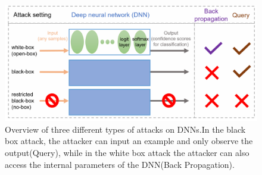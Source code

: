 \documentclass[12pt, conference, letterpaper]{IEEEtran}
\begin{document}
\begin{figure}[h]
\includegraphics[scale=0.45]{pictures/whitebox.png}
\caption{ Overview of three different types of attacks on DNNs.In the black box attack, the attacker can input an example and only observe the output(Query), while in the white box attack the attacker can also access the internal parameters of the DNN(Back Propagation). \cite{10}}
\end{figure} 
\end{document}
